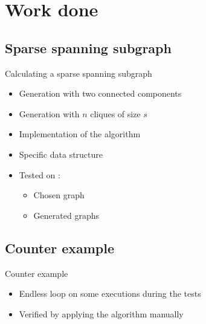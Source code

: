 \section{Work done}

\subsection{Sparse spanning subgraph}
\begin{frame}{Calculating a sparse spanning subgraph}
	\begin{itemize}
		\item Generation with two connected components
		\item Generation with $n$ cliques of size $s$
	\end{itemize}

	\begin{itemize}
		\item Implementation of the algorithm
		\item Specific data structure
		\item Tested on :
			\begin{itemize}
				\item Chosen graph
				\item Generated graphs
			\end{itemize}
	\end{itemize}
\end{frame}

\subsection{Counter example}
\begin{frame}{Counter example}
  \begin{itemize}
  \item Endless loop on some executions during the tests
  \item Verified by applying the algorithm manually
  \end{itemize}
\end{frame}


